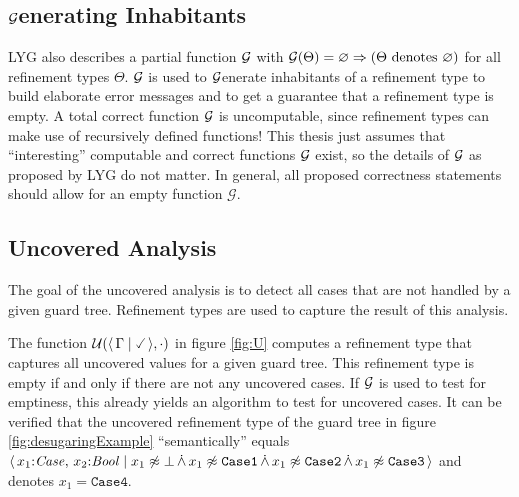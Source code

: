 \subsection{$\mathcal{G}$enerating Inhabitants}
LYG also describes a partial function $\mathcal{G}$
with $\mathcal{G}(\Theta) = \varnothing \Rightarrow (\Theta \text{ denotes } \varnothing)$ for all refinement types $\Theta$.
$\mathcal{G}$ is used to $\mathcal{G}$enerate inhabitants of a refinement type to build elaborate error messages
and to get a guarantee that a refinement type is empty.
A total correct function $\mathcal{G}$ is uncomputable, since refinement types can make use of recursively defined functions!
This thesis just assumes that ``interesting'' computable and correct functions $\mathcal{G}$ exist,
so the details of $\mathcal{G}$ as proposed by LYG do not matter.
In general, all proposed correctness statements should allow for an empty function $\mathcal{G}$.

\subsection{Uncovered Analysis}
\label{chap:bckgrdUncoveredAnalysis}

The goal of the uncovered analysis is to detect all cases that are not handled by a given guard tree.
Refinement types are used to capture the result of this analysis.

The function $\unc(\reft{\Gamma}{\true}, \cdot)$ in figure \ref{fig:U}
computes a refinement type that captures all uncovered values for a given guard tree.
This refinement type is empty if and only if there are not any uncovered cases.
If $\mathcal{G}$ is used to test for emptiness, this already yields an algorithm to test for uncovered cases.
It can be verified that the uncovered refinement type of the guard tree in
figure \ref{fig:desugaringExample} ``semantically'' equals $\langle \,  x_1{:}\mathit{Case}, \, x_2{:}\mathit{Bool} \mid  x_1 \not\approx \bot \,\dot{\wedge}\, x_1 \not\approx \mathtt{Case1} \,\dot{\wedge}\, x_1 \not\approx \mathtt{Case2} \,\dot{\wedge}\, x_1 \not\approx \mathtt{Case3}  \, \rangle$ and denotes $x_1 = \mathtt{Case4}$.

